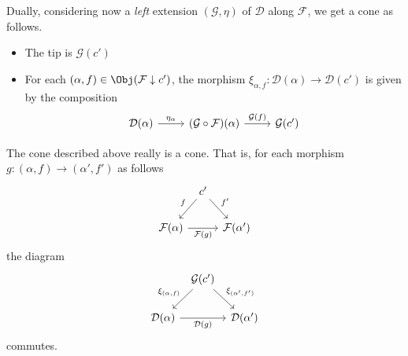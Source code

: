 \documentclass[main.tex]{subfiles}
\begin{document}
Dually, considering now a \emph{left} extension $(\mathcal{G}, \eta)$ of $\mathcal{D}$ along $\mathcal{F}$, we get a cone as follows.
\begin{itemize}
  \item The tip is $\mathcal{G}(c')$

  \item For each $(\alpha, f) \in \Obj(\mathcal{F} \downarrow c')$, the morphism $\xi_{\alpha, f}\colon \mathcal{D}(\alpha) \to \mathcal{D}(c')$ is given by the composition
    \begin{equation*}
      \begin{tikzcd}
        \mathcal{D}(\alpha)
        \arrow[r, "\eta_{\alpha}"]
        & (\mathcal{G} \circ \mathcal{F})(\alpha)
        \arrow[r, "\mathcal{G}(f)"]
        & \mathcal{G}(c')
      \end{tikzcd}
    \end{equation*}
\end{itemize}

\begin{lemma}
  \label{lemma:right_extension_induces_cone}
  The cone described above really is a cone. That is, for each morphism $g\colon (\alpha, f) \to (\alpha', f')$ as follows
  \begin{equation*}
    \begin{tikzcd}[column sep=tiny]
      & c'
      \arrow[ld, swap, "f"]
      \arrow[rd, "f'"]
      \\
      \mathcal{F}(\alpha)
      \arrow[rr, swap, "\mathcal{F}(g)"]
      && \mathcal{F}(\alpha')
    \end{tikzcd}
  \end{equation*}
  the diagram
  \begin{equation*}
    \begin{tikzcd}[column sep=tiny]
      & \mathcal{G}(c')
      \arrow[dl, swap, "\xi_{(\alpha, f)}"]
      \arrow[dr, "\xi_{(\alpha', f')}"]
      \\
      \mathcal{D}(\alpha)
      \arrow[rr, swap, "\mathcal{D}(g)"]
      && \mathcal{D}(\alpha')
    \end{tikzcd}
  \end{equation*}
  commutes.
\end{lemma}
\end{document}

